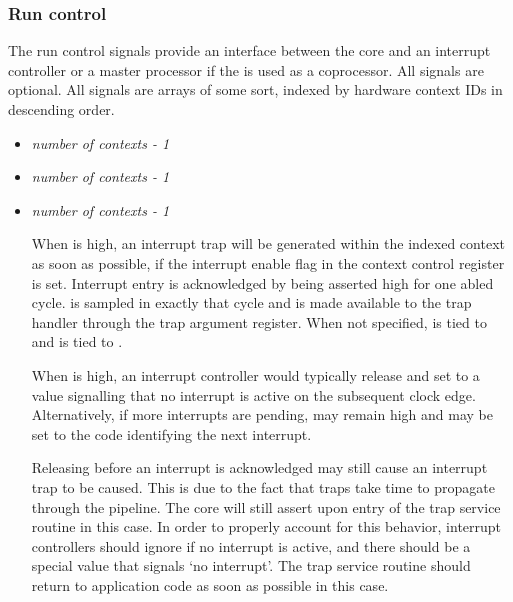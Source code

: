 
\subsubsection{Run control}
\label{sec:core-ug-cfg-inst-port-rctrl}

The run control signals provide an interface between the core and an interrupt 
controller or a master processor if the \rvex{} is used as a coprocessor. All 
signals are optional. All signals are arrays of some sort, indexed by hardware 
context IDs in descending order.

\begin{itemize}

\item {}\textit{number of contexts - 1}
\item {}\textit{number of contexts - 1}
\item {}\textit{number of contexts - 1}

When  is high, an interrupt trap will be generated within the 
indexed context as soon as possible, if the interrupt enable flag in the context 
control register is set. Interrupt entry is acknowledged by 
 being asserted high for one abled cycle. 
 is sampled in exactly that cycle and is made available to 
the trap handler through the trap argument register. When not specified, 
 is tied to  and  is tied to 
.

When  is high, an interrupt controller would typically 
release  and set  to a value signalling 
that no interrupt is active on the subsequent clock edge. Alternatively, if more
interrupts are pending,   may remain high and
 may be set to the  code identifying the next interrupt.

Releasing  before an interrupt is acknowledged may still 
cause an interrupt trap to be caused. This is due to the fact that traps take 
time to propagate through the pipeline. The core will still assert 
 upon entry of the trap service routine in this case. In 
order to properly account for this behavior, interrupt controllers should ignore 
 if no interrupt is active, and there should be a special 
 value that signals `no interrupt'. The trap service 
routine should return to application code as soon as possible in this case.


\end{itemize}
